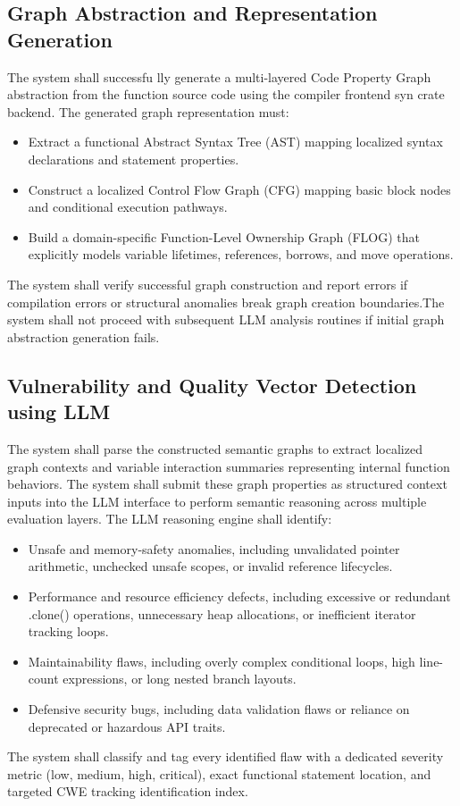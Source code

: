 \subsection{Graph Abstraction and Representation Generation}
\hspace{0.5cm}
The system shall successfu
lly generate a multi-layered Code Property Graph abstraction from the function source code using the compiler frontend syn crate backend. The generated graph representation must:
\begin{itemize}
    \item Extract a functional Abstract Syntax Tree (AST) mapping localized syntax declarations and statement properties.
    \item Construct a localized Control Flow Graph (CFG) mapping basic block nodes and conditional execution pathways.
    \item Build a domain-specific Function-Level Ownership Graph (FLOG) that explicitly models variable lifetimes, references, borrows, and move operations. 
\end{itemize} 
The system shall verify successful graph construction and report errors if compilation errors or structural anomalies break graph creation boundaries.The system shall not proceed with subsequent LLM analysis routines if initial graph abstraction generation fails.

\subsection{Vulnerability and Quality Vector Detection using LLM}
\hspace{0.5cm}
The system shall parse the constructed semantic graphs to extract localized graph contexts and variable interaction summaries representing internal function behaviors. The system shall submit these graph properties as structured context inputs into the LLM interface to perform semantic reasoning across multiple evaluation layers. The LLM reasoning engine shall identify:
\begin{itemize}
    \item Unsafe and memory-safety anomalies, including unvalidated pointer arithmetic, unchecked unsafe scopes, or invalid reference lifecycles.
    \item Performance and resource efficiency defects, including excessive or redundant .clone() operations, unnecessary heap allocations, or inefficient iterator tracking loops.
    \item Maintainability flaws, including overly complex conditional loops, high line-count expressions, or long nested branch layouts.
    \item Defensive security bugs, including data validation flaws or reliance on deprecated or hazardous API traits. 
\end{itemize} 
The system shall classify and tag every identified flaw with a dedicated severity metric (low, medium, high, critical), exact functional statement location, and targeted CWE tracking identification index.

